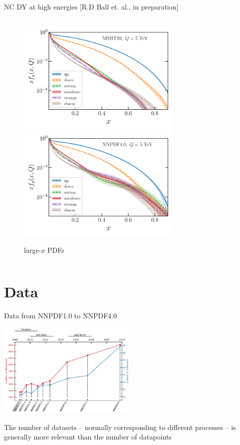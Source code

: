 \documentclass[aspectratio=169,9pt]{beamer}
\begin{document}
\begin{frame}{NC DY at high energies [R.D Ball et. al., in preparation]}
\begin{columns}
\begin{column}{0.33\textwidth}
\begin{figure}
                \includegraphics[width=0.7\textwidth]{pdfplot-abslargex-msht20}\\
                \includegraphics[width=0.7\textwidth]{pdfplot-abslargex-nnpdf40}
                \caption*{large-$x$ PDFs}
            \end{figure}
        \end{column}
    \end{columns}
    \centering
\end{frame}


\section{Data}

\begin{frame}{Data from NNPDF1.0 to NNPDF4.0}
	\begin{center}
		\includegraphics[width=0.5\textwidth]{NNPDF_data_history.pdf}
	\end{center}
	The number of datasets -- normally corresponding to different processes -- is generally more relevant than the number of datapoints
\end{frame}
\end{document}
